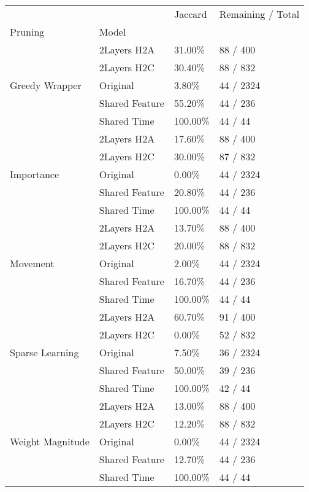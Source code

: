 \begin{tabular}{llll}
\toprule
 &  & Jaccard & Remaining / Total \\
Pruning & Model &  &  \\
\midrule
\multirow[t]{5}{*}{Greedy Wrapper} & 2Layers H2A & 31.00\% & 88 / 400 \\
 & 2Layers H2C & 30.40\% & 88 / 832 \\
 & Original & 3.80\% & 44 / 2324 \\
 & Shared Feature & 55.20\% & 44 / 236 \\
 & Shared Time & 100.00\% & 44 / 44 \\
\cline{1-4}
\multirow[t]{5}{*}{Importance} & 2Layers H2A & 17.60\% & 88 / 400 \\
 & 2Layers H2C & 30.00\% & 87 / 832 \\
 & Original & 0.00\% & 44 / 2324 \\
 & Shared Feature & 20.80\% & 44 / 236 \\
 & Shared Time & 100.00\% & 44 / 44 \\
\cline{1-4}
\multirow[t]{5}{*}{Movement} & 2Layers H2A & 13.70\% & 88 / 400 \\
 & 2Layers H2C & 20.00\% & 88 / 832 \\
 & Original & 2.00\% & 44 / 2324 \\
 & Shared Feature & 16.70\% & 44 / 236 \\
 & Shared Time & 100.00\% & 44 / 44 \\
\cline{1-4}
\multirow[t]{5}{*}{Sparse Learning} & 2Layers H2A & 60.70\% & 91 / 400 \\
 & 2Layers H2C & 0.00\% & 52 / 832 \\
 & Original & 7.50\% & 36 / 2324 \\
 & Shared Feature & 50.00\% & 39 / 236 \\
 & Shared Time & 100.00\% & 42 / 44 \\
\cline{1-4}
\multirow[t]{5}{*}{Weight Magnitude} & 2Layers H2A & 13.00\% & 88 / 400 \\
 & 2Layers H2C & 12.20\% & 88 / 832 \\
 & Original & 0.00\% & 44 / 2324 \\
 & Shared Feature & 12.70\% & 44 / 236 \\
 & Shared Time & 100.00\% & 44 / 44 \\
\cline{1-4}
\bottomrule
\end{tabular}
